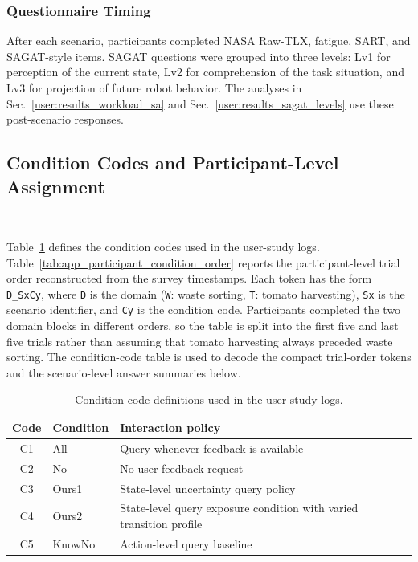 \subsubsection{Questionnaire Timing}
After each scenario, participants completed NASA Raw-TLX, fatigue, SART, and SAGAT-style items. SAGAT questions were grouped into three levels: Lv1 for perception of the current state, Lv2 for comprehension of the task situation, and Lv3 for projection of future robot behavior. The analyses in Sec.~\ref{user:results_workload_sa} and Sec.~\ref{user:results_sagat_levels} use these post-scenario responses.

\subsection{Condition Codes and Participant-Level Assignment}~\label{appx:user_assignment}

Table~\ref{tab:app_condition_codes} defines the condition codes used in the user-study logs. Table~\ref{tab:app_participant_condition_order} reports the participant-level trial order reconstructed from the survey timestamps. Each token has the form \texttt{D\_SxCy}, where \texttt{D} is the domain (\texttt{W}: waste sorting, \texttt{T}: tomato harvesting), \texttt{Sx} is the scenario identifier, and \texttt{Cy} is the condition code. Participants completed the two domain blocks in different orders, so the table is split into the first five and last five trials rather than assuming that tomato harvesting always preceded waste sorting.
The condition-code table is used to decode the compact trial-order tokens and the scenario-level answer summaries below.

\begin{table}[h]
\centering
\caption{Condition-code definitions used in the user-study logs.}
\label{tab:app_condition_codes}
\small
\begin{tabular}{cll}
\toprule
\textbf{Code} & \textbf{Condition} & \textbf{Interaction policy} \\
\midrule
C1 & All & Query whenever feedback is available \\
C2 & No & No user feedback request \\
C3 & Ours1 & State-level uncertainty query policy \\
C4 & Ours2 & State-level query exposure condition with varied transition profile \\
C5 & KnowNo & Action-level query baseline \\
\bottomrule
\end{tabular}
\end{table}

